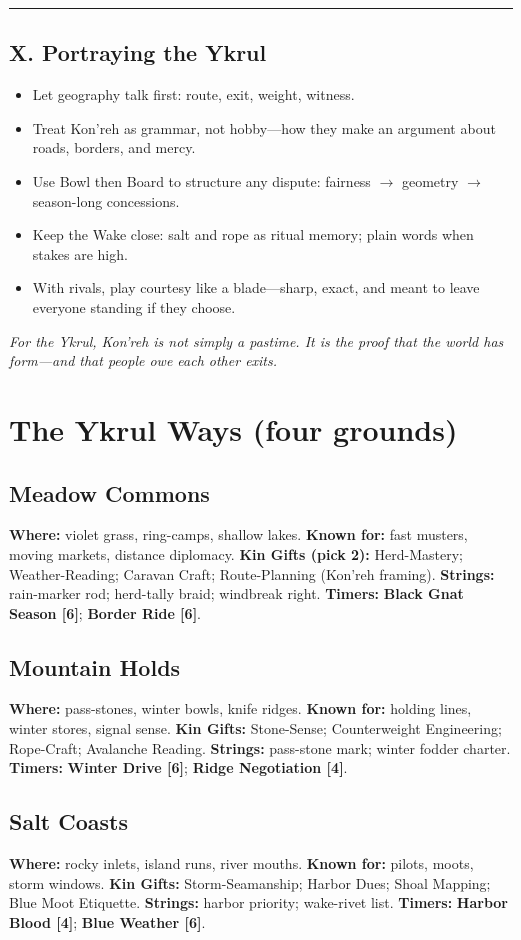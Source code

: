 \documentclass[11pt,letterpaper]{article}
\newcommand{\culture}[1]{\subsection*{#1}}
\newcommand{\timer}[2]{\textbf{#1 [#2]}}
\begin{document}
\medskip\hrule\medskip

\subsection{X. Portraying the Ykrul}

\begin{itemize}[leftmargin=*]
  \item Let geography talk first: route, exit, weight, witness.
  \item Treat Kon'reh as grammar, not hobby---how they make an argument about roads, borders, and mercy.
  \item Use Bowl then Board to structure any dispute: fairness $\rightarrow$ geometry $\rightarrow$ season-long concessions.
  \item Keep the Wake close: salt and rope as ritual memory; plain words when stakes are high.
  \item With rivals, play courtesy like a blade---sharp, exact, and meant to leave everyone standing if they choose.
\end{itemize}

\emph{For the Ykrul, Kon'reh is not simply a pastime. It is the proof that the world has form---and that people owe each other exits.}

\section{The Ykrul Ways (four grounds)}
\culture{Meadow Commons}
\textbf{Where:} violet grass, ring-camps, shallow lakes.\quad
\textbf{Known for:} fast musters, moving markets, distance diplomacy.\quad
\textbf{Kin Gifts (pick 2):} Herd-Mastery; Weather-Reading; Caravan Craft; Route-Planning (Kon'reh framing).\quad
\textbf{Strings:} rain-marker rod; herd-tally braid; windbreak right.\quad
\textbf{Timers:} \timer{Black Gnat Season}{6}; \timer{Border Ride}{6}.

\culture{Mountain Holds}
\textbf{Where:} pass-stones, winter bowls, knife ridges.\quad
\textbf{Known for:} holding lines, winter stores, signal sense.\quad
\textbf{Kin Gifts:} Stone-Sense; Counterweight Engineering; Rope-Craft; Avalanche Reading.\quad
\textbf{Strings:} pass-stone mark; winter fodder charter.\quad
\textbf{Timers:} \timer{Winter Drive}{6}; \timer{Ridge Negotiation}{4}.

\culture{Salt Coasts}
\textbf{Where:} rocky inlets, island runs, river mouths.\quad
\textbf{Known for:} pilots, moots, storm windows.\quad
\textbf{Kin Gifts:} Storm-Seamanship; Harbor Dues; Shoal Mapping; Blue Moot Etiquette.\quad
\textbf{Strings:} harbor priority; wake-rivet list.\quad
\textbf{Timers:} \timer{Harbor Blood}{4}; \timer{Blue Weather}{6}.
\end{document}
